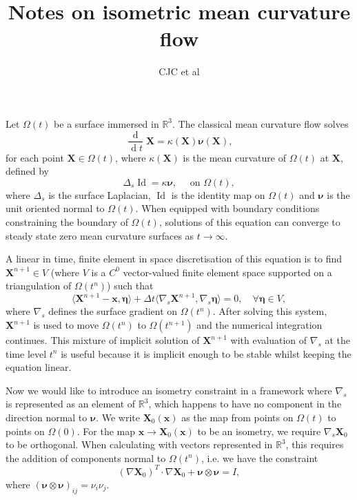 \documentclass{article}
\def\MM#1{\boldsymbol{#1}}
\newcommand{\dd}[2]{\frac{\diff#1}{\diff#2}}
\def\MM#1{\boldsymbol{#1}}
\DeclareMathOperator{\diff}{d}
\DeclareMathOperator{\Id}{Id}
\begin{document}
\title{Notes on isometric mean curvature flow}
\author{CJC et al}
\maketitle

Let $\Omega(t)$ be a surface immersed in $\mathbb{R}^3$.  The classical
mean curvature flow solves
\begin{equation}
\dd{}{t}\MM{X} = \kappa(\MM{X})\MM{\nu}(\MM{X}),
\end{equation}
for each point $\MM{X}\in\Omega(t)$, where $\kappa(\MM{X})$ is the
mean curvature of $\Omega(t)$ at $\MM{X}$, defined by
\begin{equation}
\Delta_s \Id = \kappa \MM{\nu}, \quad \mbox{ on }\Omega(t),
\end{equation}
where $\Delta_s$ is the surface Laplacian, $\Id$ is the identity map
on $\Omega(t)$ and $\MM{\nu}$ is the unit oriented normal to
$\Omega(t)$. When equipped with boundary conditions constraining
the boundary of $\Omega(t)$, solutions of this equation can converge
to steady state zero mean curvature surfaces as $t\to \infty$.

A linear in time, finite element in space discretisation of this
equation is to find $\MM{X}^{n+1}\in V$ (where $V$ is a $C^0$
vector-valued finite element space supported on a triangulation of
$\Omega(t^n)$) such that
\begin{equation}
\label{eq:discrete flow}
\langle \MM{X}^{n+1} - \MM{x}, \MM{\MM{\eta}} \rangle
+\Delta t \langle \nabla_s \MM{X}^{n+1}, \nabla_s \MM{\MM{\eta}}\rangle = 0,
\quad \forall \MM{\MM{\eta}}\in V,
\end{equation}
where $\nabla_s$ defines the surface gradient on $\Omega(t^n)$.  After
solving this system, $\MM{X}^{n+1}$ is used to move
$\Omega(t^n)$ to $\Omega(t^{n+1})$ and the numerical integration
continues. This mixture of implicit solution of $\MM{X}^{n+1}$ with
evaluation of $\nabla_s$ at the time level $t^n$ is useful
because it is implicit enough to be stable whilst keeping the equation
linear.

Now we would like to introduce an isometry constraint in a framework
where $\nabla_s$ is represented as an element of $\mathbb{R}^3$, which
happens to have no component in the direction normal to $\MM{\nu}$.
We write $\MM{X}_0(\MM{x})$ as the map from points on $\Omega(t)$ to
points on $\Omega(0)$.
For the map $\MM{x}\to \MM{X}_0(\MM{x})$ to be an isometry, we
require $\nabla_s\MM{X}_0$ to be orthogonal. When calculating
with vectors represented in $\mathbb{R}^3$, this requires the addition
of components normal to $\Omega(t^n)$, i.e. we have the constraint
\begin{equation}
(\nabla \MM{X}_0)^T\cdot \nabla \MM{X}_0 + \MM{\nu}\otimes\MM{\nu} = I,
\end{equation}
where $(\MM{\nu}\otimes\MM{\nu})_{ij}=\nu_i\nu_j$.
\end{document}
